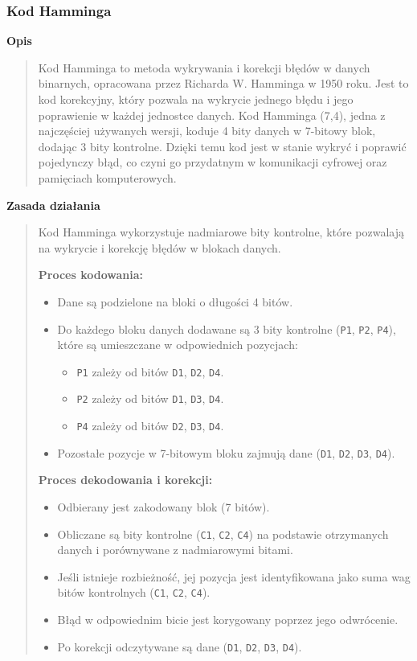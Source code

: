 \documentclass[12pt,a4paper]{article}
\begin{document}
\subsubsection{Kod Hamminga}
\noindent\textbf{Opis}
\begin{quotation}\noindent Kod Hamminga to metoda wykrywania i korekcji błędów w danych binarnych, opracowana przez Richarda W. Hamminga w 1950 roku. Jest to kod korekcyjny, który pozwala na wykrycie jednego błędu i jego poprawienie w każdej jednostce danych. Kod Hamminga (7,4), jedna z najczęściej używanych wersji, koduje 4 bity danych w 7-bitowy blok, dodając 3 bity kontrolne. Dzięki temu kod jest w stanie wykryć i poprawić pojedynczy błąd, co czyni go przydatnym w komunikacji cyfrowej oraz pamięciach komputerowych.
\end{quotation}

\noindent\textbf{Zasada działania}
\begin{quotation}\noindent Kod Hamminga wykorzystuje nadmiarowe bity kontrolne, które pozwalają na wykrycie i korekcję błędów w blokach danych.

\noindent\textbf{Proces kodowania:}
\begin{itemize}
\item Dane są podzielone na bloki o długości 4 bitów.
\item Do każdego bloku danych dodawane są 3 bity kontrolne (\texttt{P1}, \texttt{P2}, \texttt{P4}), które są umieszczane w odpowiednich pozycjach:
\begin{itemize}
\item \texttt{P1} zależy od bitów \texttt{D1}, \texttt{D2}, \texttt{D4}.
\item \texttt{P2} zależy od bitów \texttt{D1}, \texttt{D3}, \texttt{D4}.
\item \texttt{P4} zależy od bitów \texttt{D2}, \texttt{D3}, \texttt{D4}.
\end{itemize}
\item Pozostałe pozycje w 7-bitowym bloku zajmują dane (\texttt{D1}, \texttt{D2}, \texttt{D3}, \texttt{D4}).
\end{itemize}

\noindent\textbf{Proces dekodowania i korekcji:}
\begin{itemize}
\item Odbierany jest zakodowany blok (7 bitów).
\item Obliczane są bity kontrolne (\texttt{C1}, \texttt{C2}, \texttt{C4}) na podstawie otrzymanych danych i porównywane z nadmiarowymi bitami.
\item Jeśli istnieje rozbieżność, jej pozycja jest identyfikowana jako suma wag bitów kontrolnych (\texttt{C1}, \texttt{C2}, \texttt{C4}).
\item Błąd w odpowiednim bicie jest korygowany poprzez jego odwrócenie.
\item Po korekcji odczytywane są dane (\texttt{D1}, \texttt{D2}, \texttt{D3}, \texttt{D4}).
\end{itemize}
\end{quotation}
\end{document}

